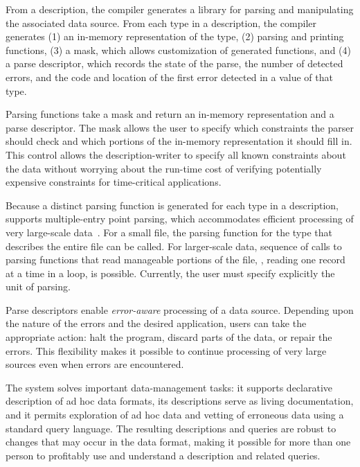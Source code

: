 From a description, the \pads{} compiler generates a \C{} library for
parsing and manipulating the associated data source.  From each type
in a \pads{} description, the compiler generates (1) an in-memory
representation of the type, (2) parsing and printing functions, (3) a
mask, which allows customization of generated functions, and (4) a
parse descriptor, which records the state of the parse, the number of
detected errors, and the code and location of the first error detected
in a value of that type.

Parsing functions take a mask and return an in-memory representation
and a parse descriptor.  The mask allows the user to specify which
constraints the parser should check and which portions of the
in-memory representation it should fill in.  This control allows the
description-writer to specify all known constraints about the data
without worrying about the run-time cost of verifying potentially
expensive constraints for time-critical applications.

Because a distinct parsing function is generated for each type in a
\pads{} description, \pads{} supports multiple-entry point parsing,
which accommodates efficient processing of very large-scale
data~\cite{fisher+:pldi05}.  For a small file, the parsing function
for the \pads{} type that describes the entire file can be called.
For larger-scale data, sequence of calls to parsing functions that
read manageable portions of the file, \eg{}, reading one record at a
time in a loop, is possible.  Currently, the user must specify
explicitly the unit of parsing.

Parse descriptors enable \emph{error-aware} processing of a data
source.  Depending upon the nature of the errors and the desired
application, users can take the appropriate action: halt the program,
discard parts of the data, or repair the errors.  This flexibility
makes it possible to continue processing of very large sources even
when errors are encountered.

The \pads{} system solves important data-management tasks: it supports
declarative description of ad hoc data formats, its descriptions serve
as living documentation, and it permits exploration of ad hoc data and
vetting of erroneous data using a standard query language.  The
resulting \pads{} descriptions and queries are robust to changes that
may occur in the data format, making it possible for more than one
person to profitably use and understand a \pads{} description and
related queries.


